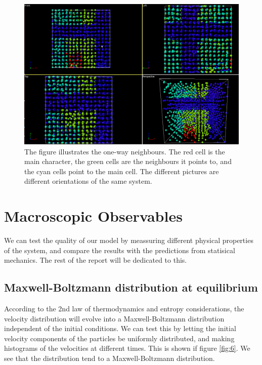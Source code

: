\documentclass[12pt]{article}
\begin{document}
  \begin{figure}
\centering
\includegraphics[width=16cm]{neighbourcells.png}
\caption{\label{fig:5} The figure illustrates the one-way neighbours. The red cell is the main character, the green cells are the neighbours it points to, and the cyan cells point to the main cell. The different pictures are different orientations of the same system.}
\end{figure}

\section{Macroscopic Observables}
We can test the quality of our model by meassuring different physical properties of the system, and compare the results with the predictions from statisical mechanics. The rest of the report will be dedicated to this.

\subsection{Maxwell-Boltzmann distribution at equilibrium}
According to the 2nd law of thermodynamics and entropy considerations, the velocity distribution will evolve into a Maxwell-Boltzmann distribution independent of the initial conditions. We can test this by letting the initial velocity components of the particles be uniformly distributed, and making histograms of the velocities at different times. This is shown if figure \ref{fig:6}. We see that the distribution tend to a Maxwell-Boltzmann distribution.
\end{document}
